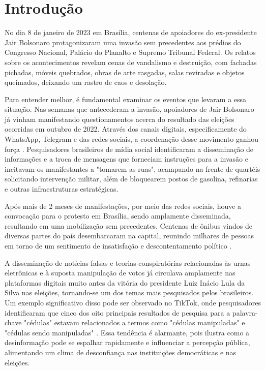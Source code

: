 \documentclass[manuscript,screen,review]{acmart}
\begin{document}


\maketitle

\section{Introdução}

No dia 8 de janeiro de 2023 em Brasília, centenas de apoiadores do ex-presidente Jair Bolsonaro protagonizaram uma invasão sem precedentes aos prédios do Congresso Nacional, Palácio do Planalto e Supremo Tribunal Federal. Os relatos sobre os acontecimentos revelam cenas de vandalismo e destruição, com fachadas pichadas, móveis quebrados, obras de arte rasgadas, salas reviradas e objetos queimados, deixando um rastro de caos e desolação.

Para entender melhor, é fundamental examinar os eventos que levaram a essa situação. Nas semanas que antecederam a invasão, apoiadores de Jair Bolsonaro já vinham manifestando questionamentos acerca do resultado das eleições ocorridas em outubro de 2022. Através dos canais digitais, especificamente do WhatsApp, Telegram e das redes sociais, a coordenação desse movimento ganhou força \cite{tagiarolli2023}. Pesquisadores brasileiros de mídia social identificaram a disseminação de informações e a troca de mensagens que forneciam instruções para a invasão e incitavam os manifestantes a "tomarem as ruas", acampando na frente de quartéis solicitando intervenção militar, além de bloquearem postos de gasolina, refinarias e outras infraestruturas estratégicas.

Após mais de 2 meses de manifestações, por meio das redes sociais, houve a convocação para o protesto em Brasília, sendo amplamente disseminada, resultando em uma mobilização sem precedentes. Centenas de ônibus vindos de diversas partes do país desembarcaram na capital, reunindo milhares de pessoas em torno de um sentimento de insatisfação e descontentamento político \cite{politize2023}.

A disseminação de notícias falsas e teorias conspiratórias relacionadas às urnas eletrônicas e à suposta manipulação de votos já circulava amplamente nas plataformas digitais muito antes da vitória do presidente Luiz Inácio Lula da Silva nas eleições, tornando-se um dos temas mais pesquisados pelos brasileiros. Um exemplo significativo disso pode ser observado no TikTok, onde pesquisadores identificaram que cinco dos oito principais resultados de pesquisa para a palavra-chave "cédulas" estavam relacionados a termos como "cédulas manipuladas" e "cédulas sendo manipuladas" \cite{machado2023}. Essa tendência é alarmante, pois ilustra como a desinformação pode se espalhar rapidamente e influenciar a percepção pública, alimentando um clima de desconfiança nas instituições democráticas e nas eleições.
\end{document}
